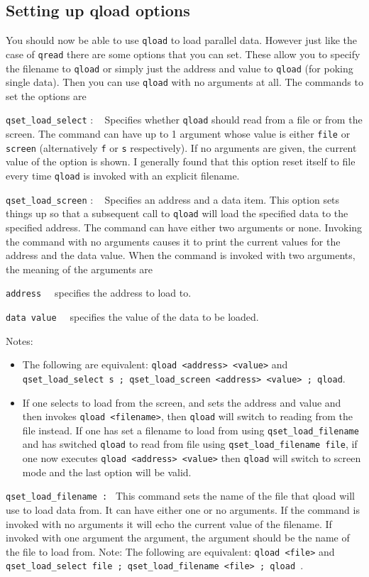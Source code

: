 \subsection{Setting up qload options}
You should now be able to use {\tt qload} to load parallel data. However
just like the case of {\tt qread} there are some options that you can
set. These allow you to specify the filename to {\tt qload} or simply 
just the address and value to {\tt qload} (for poking single data). Then 
you can use {\tt qload} with no arguments at all. The commands to set 
the options are
\begin{description}
\item{ {\tt qset\_load\_select} : \ } Specifies whether {\tt qload} should
read from a file or from the screen. The command can have up to 1 argument
whose value is either {\tt file} or {\tt screen} (alternatively {\tt f} or
{\tt s} respectively). If no arguments are given, the current value of
the option is shown. I generally found that this option reset itself to 
file every time {\tt qload} is invoked with an explicit filename.
\item{ {\tt qset\_load\_screen} : \ } Specifies an address and a data 
item. This option sets things up so that a subsequent call to {\tt qload} 
will load the specified data to the specified address. The command can 
have either  two arguments or none. Invoking the command with no arguments
causes it to print the current values for the address and the data value.
When the command is invoked with two arguments, the meaning of the arguments
are
\begin{description} 
\item{\tt address \ } specifies the address to load to.
\item{\tt data value \ } specifies the value of the data to be loaded.
\end{description}
Notes:
\begin{itemize}
\item 
The following are equivalent: {\tt qload <address> <value>} and {\tt qset\_load\_select s ; qset\_load\_screen <address> <value> ; qload}.
\item
If one selects to load from the screen, and sets the address and value and
then invokes {\tt qload <filename>}, then {\tt qload} will switch to 
reading from the file instead. If one has set a filename to load from 
using {\tt qset\_load\_filename} and has switched {\tt qload} to read from 
file using {\tt qset\_load\_filename file}, if one now executes {\tt qload <address> <value>} then {\tt qload} will switch to screen mode and the last option
will be valid.
\end{itemize}
\item{\tt qset\_load\_filename : } This command sets the name of the file
that qload will use to load data from. It can have either one or no arguments.
If the command is invoked with no arguments it will echo the current value
of the filename. If invoked with one argument the argument, the argument
should be the name of the file to load from.
Note: The following are equivalent: {\tt qload <file>} and {\tt qset\_load\_select file ; qset\_load\_filename <file> ; qload }.
\end{description}

